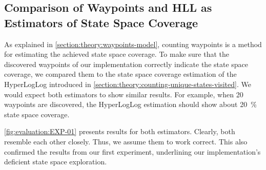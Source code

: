 \documentclass[
fancyheadings, %
%
%
]{stsreprt}
\begin{document}
\subsection{Comparison of Waypoints and HLL as Estimators of State Space Coverage}

As explained in \cref{section:theory:waypoints-model}, counting waypoints is a method for estimating the achieved state space coverage.
To make sure that the discovered waypoints of our implementation correctly indicate the state space coverage, we compared them to the state space coverage estimation of the HyperLogLog introduced in \cref{section:theory:counting-unique-states-visited}.
We would expect both estimators to show similar results.
For example, when 20 waypoints are discovered, the HyperLogLog estimation should show about \SI{20}{\percent} state space coverage.

\cref{fig:evaluation:EXP-01} presents results for both estimators.
Clearly, both resemble each other closely.
Thus, we assume them to work correct.
This also confirmed the results from our first experiment, underlining our implementation's deficient state space exploration.
\end{document}
